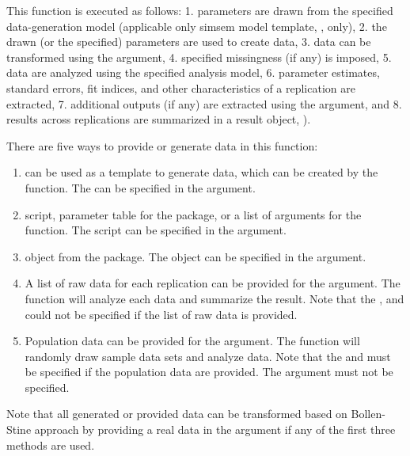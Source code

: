 \documentclass[a4paper]{book}
\begin{document}
\begin{Details}\relax
This function is executed as follows: 1. parameters are drawn from the specified data-generation model (applicable only simsem model template, , only), 2. the drawn (or the specified) parameters are used to create data, 3. data can be transformed using the  argument, 4. specified missingness (if any) is imposed, 5. data are analyzed using the specified analysis model, 6. parameter estimates, standard errors, fit indices, and other characteristics of a replication are extracted, 7. additional outputs (if any) are extracted using the  argument, and 8. results across replications are summarized in a result object, ).

There are five ways to provide or generate data in this function: 
\begin{enumerate}

\item {} can be used as a template to generate data, which can be created by the  function. The  can be specified in the  argument.
\item {} script, parameter table for the  package, or a list of arguments for the  function. The  script can be specified in the  argument.
\item {} object from the  package. The  object can be specified in the  argument.
\item A list of raw data for each replication can be provided for the  argument. The  function will analyze each data and summarize the result. Note that the ,  and  could not be specified if the list of raw data is provided.
\item Population data can be provided for the  argument. The  function will randomly draw sample data sets and analyze data. Note that the  and  must be specified if the population data are provided. The  argument must not be specified.

\end{enumerate}


Note that all generated or provided data can be transformed based on Bollen-Stine approach by providing a real data in the  argument if any of the first three methods are used.


\end{Details}
\end{document}

